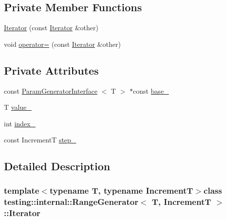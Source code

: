 \subsection*{\-Private \-Member \-Functions}
\begin{DoxyCompactItemize}
\item 
\hyperlink{classtesting_1_1internal_1_1RangeGenerator_1_1Iterator_a2b76c2e597bc9393f2b99e869e4fa8d2}{\-Iterator} (const \hyperlink{classtesting_1_1internal_1_1RangeGenerator_1_1Iterator}{\-Iterator} \&other)
\item 
void \hyperlink{classtesting_1_1internal_1_1RangeGenerator_1_1Iterator_ac087d740f6aa05ec07afd0c5c0327105}{operator=} (const \hyperlink{classtesting_1_1internal_1_1RangeGenerator_1_1Iterator}{\-Iterator} \&other)
\end{DoxyCompactItemize}
\subsection*{\-Private \-Attributes}
\begin{DoxyCompactItemize}
\item 
const \hyperlink{classtesting_1_1internal_1_1ParamGeneratorInterface}{\-Param\-Generator\-Interface}\*
$<$ \-T $>$ $\ast$const \hyperlink{classtesting_1_1internal_1_1RangeGenerator_1_1Iterator_a93e2c6416427150cd20cce832f699e19}{base\-\_\-}
\item 
\-T \hyperlink{classtesting_1_1internal_1_1RangeGenerator_1_1Iterator_ae496c0f6edafccdab7ef2e2b9d0c7e03}{value\-\_\-}
\item 
int \hyperlink{classtesting_1_1internal_1_1RangeGenerator_1_1Iterator_aaaf1ac02dfa554a3cdffc647d512a77b}{index\-\_\-}
\item 
const \-Increment\-T \hyperlink{classtesting_1_1internal_1_1RangeGenerator_1_1Iterator_ab1ed3e7cdff8cb7dd4d077c865a66c1a}{step\-\_\-}
\end{DoxyCompactItemize}


\subsection{\-Detailed \-Description}
\subsubsection*{template$<$typename T, typename Increment\-T$>$class testing\-::internal\-::\-Range\-Generator$<$ T, Increment\-T $>$\-::\-Iterator}



